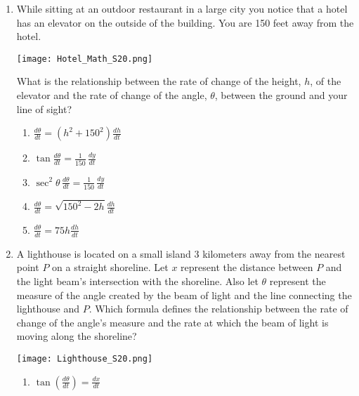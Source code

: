 \documentclass[12pt]{report}
\begin{document}
\begin{enumerate}

\item While sitting at an outdoor restaurant in a large city you notice that a hotel has an elevator on the outside of the building. You are 150 feet away from the hotel. 

\begin{center}
\texttt{[image: Hotel\_Math\_S20.png]}
\end{center}

What is the relationship between the rate of change of the height, $h$, of the elevator and the rate of change of the angle, $\theta$, between the ground and your line of sight?

\begin{enumerate}

\item $\frac{d\theta}{dt}=\left(h^2+150^2\right)\frac{dh}{dt}$

\item $\tan\frac{d\theta}{dt}=\frac{1}{150}\,\frac{dy}{dt}$

\item $\sec^2\theta\,\frac{d\theta}{dt}=\frac{1}{150}\,\frac{dy}{dt}
$

\item $\frac{d\theta}{dt}=\sqrt{150^2-2h}\frac{dh}{dt}$

\item $\frac{d\theta}{dt}=75h\frac{dh}{dt}$
\end{enumerate}

\pagebreak

\item A lighthouse is located on a small island 3 kilometers away from the nearest point $P$ on a straight shoreline. Let $x$ represent the distance between $P$ and the light beam's intersection with the shoreline. Also let $\theta$ represent the measure of the angle created by the beam of light and the line connecting the lighthouse and $P$. Which formula defines the relationship between the rate of change of the angle's measure and the rate at which the beam of light is moving along the shoreline?

\begin{center}
\texttt{[image: Lighthouse\_S20.png]}
\end{center}

\begin{enumerate}

\item $\tan\left(\frac{d\theta}{dt}\right) = \frac{dx}{dt}$


\end{enumerate}
\end{enumerate}
\end{document}
